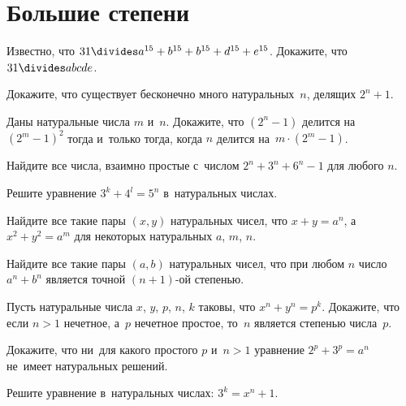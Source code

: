 

\section*{Большие степени}


\begin{problems}

\item
Известно, что $31 \divides a^{15} + b^{15} + b^{15} + d^{15} + e^{15}$.
Докажите, что $31 \divides a b c d e$.

\item
Докажите, что существует бесконечно много натуральных~$n$, делящих $2^n + 1$.

\item
Даны натуральные числа $m$ и~$n$.
Докажите, что $(2^n - 1)$ делится на~$(2^m - 1)^2$ тогда и~только тогда, когда
$n$ делится на~$m \cdot (2^m - 1)$.

\item
Найдите все числа, взаимно простые с~числом $2^n + 3^n + 6^n - 1$ для
любого $n$.

\item
Решите уравнение $3^k + 4^l = 5^n$ в~натуральных числах.

\item
Найдите все такие пары $(x, y)$ натуральных чисел, что $x + y = a^n$,
а~$x^2 + y^2 = a^m$ для некоторых натуральных $a$, $m$, $n$.

\item
Найдите все такие пары $(a, b)$ натуральных чисел, что при любом $n$ число
$a^n + b^n$ является точной $(n + 1)$-ой степенью.

\item
Пусть натуральные числа $x$, $y$, $p$, $n$, $k$ таковы, что $x^n + y^n = p^k$.
Докажите, что если $n > 1$ нечетное, а~$p$ нечетное простое, то~$n$ является
степенью числа~$p$.

\item
Докажите, что ни~для какого простого $p$ и~$n > 1$ уравнение $2^p + 3^p = a^n$
не~имеет натуральных решений.

\item
Решите уравнение в~натуральных числах: $3^k = x^n + 1$.

\end{problems}

